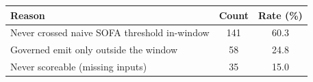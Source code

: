 \begin{tabular}{@{}lcc@{}}
\toprule
Reason & Count & Rate (\%) \\
\midrule
Never crossed naive SOFA threshold in-window & 141 & 60.3 \\
Governed emit only outside the window & 58 & 24.8 \\
Never scoreable (missing inputs) & 35 & 15.0 \\
\bottomrule
\end{tabular}
